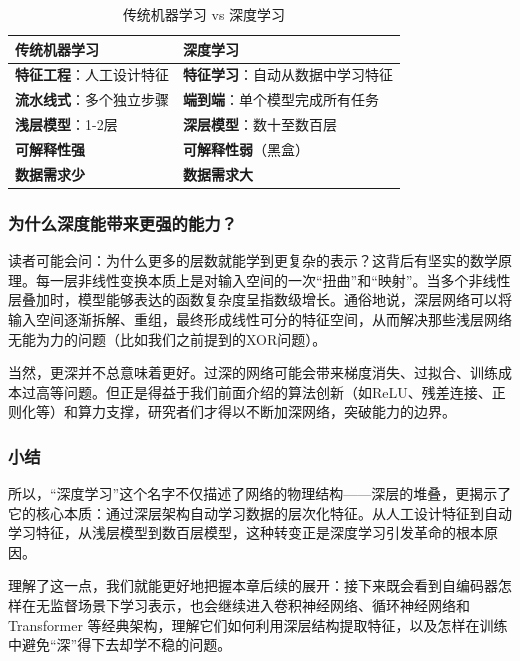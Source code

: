 \documentclass[lang=cn,zihao=-4,a4paper,fontset=windows]{beautybook}
\begin{document}
\begin{table}[h]
\centering
\caption{传统机器学习 vs 深度学习}
\begin{tabular}{p{}p{}}
\toprule
\textbf{传统机器学习} & \textbf{深度学习} \\
\midrule
\textbf{特征工程}：人工设计特征 & \textbf{特征学习}：自动从数据中学习特征 \\
\textbf{流水线式}：多个独立步骤 & \textbf{端到端}：单个模型完成所有任务 \\
\textbf{浅层模型}：1-2层 & \textbf{深层模型}：数十至数百层 \\
\textbf{可解释性强} & \textbf{可解释性弱}（黑盒） \\
\textbf{数据需求少} & \textbf{数据需求大} \\
\bottomrule
\end{tabular}
\end{table}

\subsubsection*{为什么深度能带来更强的能力？}

读者可能会问：为什么更多的层数就能学到更复杂的表示？这背后有坚实的数学原理。每一层非线性变换本质上是对输入空间的一次“扭曲”和“映射”。当多个非线性层叠加时，模型能够表达的函数复杂度呈指数级增长。通俗地说，深层网络可以将输入空间逐渐拆解、重组，最终形成线性可分的特征空间，从而解决那些浅层网络无能为力的问题（比如我们之前提到的XOR问题）。

当然，更深并不总意味着更好。过深的网络可能会带来梯度消失、过拟合、训练成本过高等问题。但正是得益于我们前面介绍的算法创新（如ReLU、残差连接、正则化等）和算力支撑，研究者们才得以不断加深网络，突破能力的边界。

\subsubsection*{小结}

所以，“深度学习”这个名字不仅描述了网络的物理结构——深层的堆叠，更揭示了它的核心本质：通过深层架构自动学习数据的层次化特征。从人工设计特征到自动学习特征，从浅层模型到数百层模型，这种转变正是深度学习引发革命的根本原因。

理解了这一点，我们就能更好地把握本章后续的展开：接下来既会看到自编码器怎样在无监督场景下学习表示，也会继续进入卷积神经网络、循环神经网络和 Transformer 等经典架构，理解它们如何利用深层结构提取特征，以及怎样在训练中避免“深”得下去却学不稳的问题。
\end{document}
